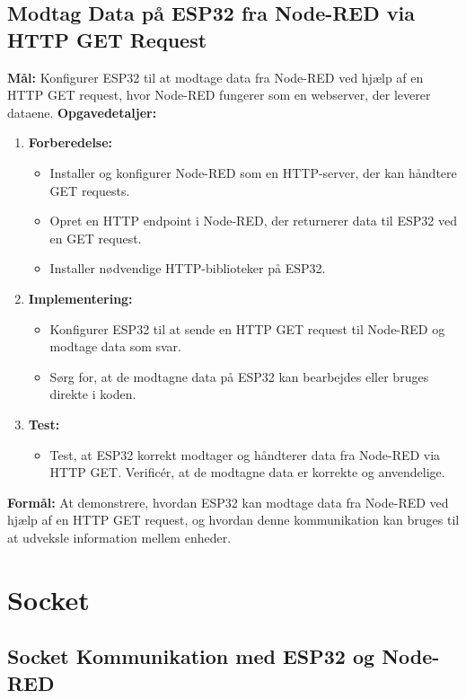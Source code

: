 \documentclass[12pt,a4paper]{book}
\begin{document}
	\subsection*{Modtag Data på ESP32 fra Node-RED via HTTP GET Request}
	\textbf{Mål:} Konfigurer ESP32 til at modtage data fra Node-RED ved hjælp af en HTTP GET request, hvor Node-RED fungerer som en webserver, der leverer dataene.
	\newline\newline\noindent
	\textbf{Opgavedetaljer:}
	\begin{enumerate}
		\item \textbf{Forberedelse:}
		\begin{itemize}
			\item Installer og konfigurer Node-RED som en HTTP-server, der kan håndtere GET requests.
			\item Opret en HTTP endpoint i Node-RED, der returnerer data til ESP32 ved en GET request.
			\item Installer nødvendige HTTP-biblioteker på ESP32.
		\end{itemize}
		\item \textbf{Implementering:}
		\begin{itemize}
			\item Konfigurer ESP32 til at sende en HTTP GET request til Node-RED og modtage data som svar.
			\item Sørg for, at de modtagne data på ESP32 kan bearbejdes eller bruges direkte i koden.
		\end{itemize}
		\item \textbf{Test:}
		\begin{itemize}
			\item Test, at ESP32 korrekt modtager og håndterer data fra Node-RED via HTTP GET. Verificér, at de modtagne data er korrekte og anvendelige.
		\end{itemize}
	\end{enumerate}
	\textbf{Formål:} At demonstrere, hvordan ESP32 kan modtage data fra Node-RED ved hjælp af en HTTP GET request, og hvordan denne kommunikation kan bruges til at udveksle information mellem enheder.
	
	\section{Socket}
	\subsection*{Socket Kommunikation med ESP32 og Node-RED}
\end{document}
